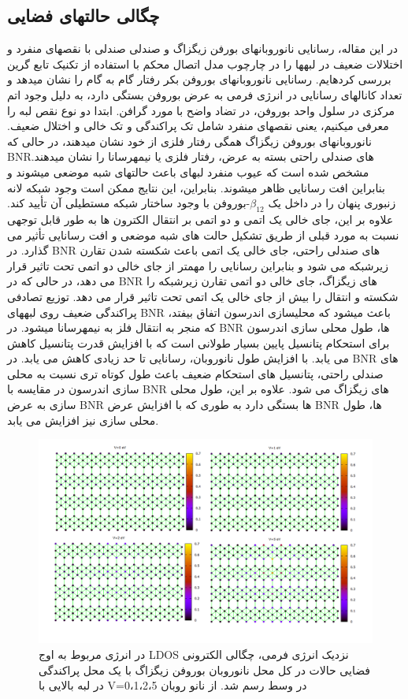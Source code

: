 \subsection{چگالی حالتهای فضایی}
در این مقاله، رسانایی نانوروبانهای بورفن زیگزاگ و صندلی صندلی با نقصهای منفرد و اختلالات ضعیف در لبهها را در چارچوب مدل اتصال محکم با استفاده از تکنیک تابع گرین بررسی کردهایم. رسانایی نانوروبانهای بوروفن بکر رفتار گام به گام را نشان میدهد و تعداد کانالهای رسانایی در انرژی فرمی به عرض بوروفن بستگی دارد، به دلیل وجود اتم مرکزی در سلول واحد بوروفن، در تضاد واضح با مورد گرافن. ابتدا دو نوع نقص لبه را معرفی میکنیم، یعنی نقصهای منفرد شامل تک پراکندگی و تک خالی و اختلال ضعیف. نانوروبانهای بوروفن زیگزاگ همگی رفتار فلزی از خود نشان میدهند، در حالی که BNRهای صندلی راحتی بسته به عرض، رفتار فلزی یا نیمهرسانا را نشان میدهند. مشخص شده است که عیوب منفرد لبهای باعث حالتهای شبه موضعی میشوند و بنابراین افت رسانایی ظاهر میشوند. بنابراین، این نتایج ممکن است وجود شبکه لانه زنبوری پنهان را در داخل یک $\beta_{12}$-بوروفن با وجود ساختار شبکه مستطیلی آن تأیید کند. علاوه بر این، جای خالی یک اتمی و دو اتمی بر انتقال الکترون ها به طور قابل توجهی نسبت به مورد قبلی از طریق تشکیل حالت های شبه موضعی و افت رسانایی تأثیر می گذارد. در BNR های صندلی راحتی، جای خالی یک اتمی باعث شکسته شدن تقارن زیرشبکه می شود و بنابراین رسانایی را مهمتر از جای خالی دو اتمی تحت تاثیر قرار می دهد، در حالی که در BNR های زیگزاگ، جای خالی دو اتمی تقارن زیرشبکه را شکسته و انتقال را بیش از جای خالی یک اتمی تحت تاثیر قرار می دهد. توزیع تصادفی پراکندگی ضعیف روی لبههای BNR باعث میشود که محلیسازی اندرسون اتفاق بیفتد، که منجر به انتقال فلز به نیمهرسانا میشود. در BNR ها، طول محلی سازی اندرسون برای استحکام پتانسیل پایین بسیار طولانی است که با افزایش قدرت پتانسیل کاهش می یابد. با افزایش طول نانوروبان، رسانایی تا حد زیادی کاهش می یابد. در BNR های صندلی راحتی، پتانسیل های استحکام ضعیف باعث طول کوتاه تری نسبت به محلی سازی اندرسون در مقایسه با BNR های زیگزاگ می شود. علاوه بر این، طول محلی سازی به عرض BNR ها بستگی دارد به طوری که با افزایش عرض BNR ها، طول محلی سازی نیز افزایش می یابد.

\begin{figure}[!ht]
  \centering
  \includegraphics[width=1\linewidth]{./figures/Slide1.PNG}
  \caption{در انرژی مربوط به اوج LDOS نزدیک انرژی فرمی، چگالی الکترونی فضایی حالات در کل محل نانوروبان بوروفن زیگزاگ با یک محل پراکندگی در لبه بالایی با V=0،1،2،5 در وسط رسم شد. از نانو روبان}
  \label{zigCSLDOS}
\end{figure}

